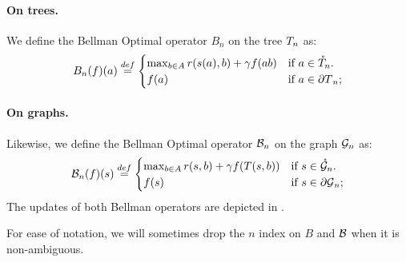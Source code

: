 \documentclass[runningheads]{llncs}
\begin{document}
\begin{definition}
	\label{def:bellman}
	\paragraph{\textbf{On trees.}} We define the Bellman Optimal operator $B_n$ on the tree $T_n$ as:
	\begin{equation}
	\label{eq:bellman-tree}
	B_n(f)(a) \stackrel{def}{=} \begin{cases}
	\max_{b\in A} r(s(a), b) + \gamma f({ab})
	& \text{if $a\in\mathring{T}_n$.} \\
	f(a) & \text{if $a\in{\partial T}_n$;}
	\end{cases}
	\end{equation}
	
	\paragraph{\textbf{On graphs.}} Likewise, we define the Bellman Optimal operator $\mathcal{B}_n$ on the graph $\mathcal{G}_n$ as:
	\begin{equation}
	\label{eq:bellman-graph}
	\mathcal{B}_n(f)(s) \stackrel{def}{=} \begin{cases}
	\max_{b\in A} r(s, b) + \gamma f(T(s,b))
	& \text{if $s\in\mathring{\mathcal{G}}_n$.} \\
	f(s) & \text{if $s\in{\partial \mathcal{G}}_n$;}
	\end{cases}
	\end{equation}
	The updates of both Bellman operators are depicted in .
\end{definition}

\begin{remark}
	For ease of notation, we will sometimes drop the $n$ index on $B$ and $\mathcal{B}$ when it is non-ambiguous.
\end{remark}
\end{document}
